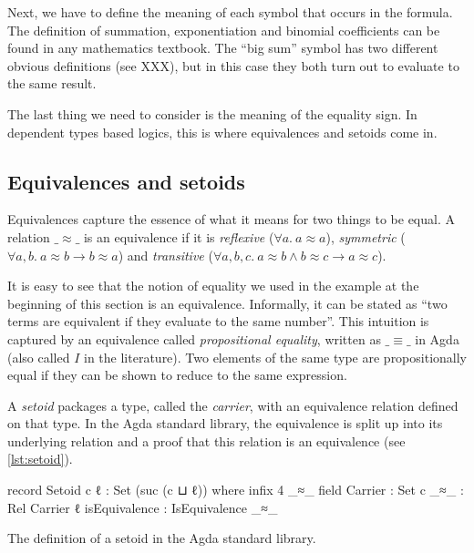 Next, we have to define the meaning of each symbol that occurs in the formula. The definition of summation, exponentiation and binomial coefficients can be found in any mathematics textbook. The \enquote{big sum} symbol has two different obvious definitions (see XXX), but in this case they both turn out to evaluate to the same result.

The last thing we need to consider is the meaning of the equality sign. In dependent types based logics, this is where equivalences and setoids come in.

\subsection{Equivalences and setoids}

Equivalences capture the essence of what it means for two things to be equal. A relation \(\_\!\!\approx\!\!\_\) is an equivalence if it is \emph{reflexive} (\(\forall a.\ a \approx a\)), \emph{symmetric} (\(\forall a,b.\ a \approx b \rightarrow b \approx a\)) and \emph{transitive} (\(\forall a,b,c.\ a \approx b \wedge b \approx c \rightarrow a \approx c\)).

It is easy to see that the notion of equality we used in the example at the beginning of this section is an equivalence. Informally, it can be stated as \enquote{two terms are equivalent if they evaluate to the same number}. This intuition is captured by an equivalence called \emph{propositional equality}, written as \(\_\!\!\equiv\!\!\_\) in Agda (also called \(I\) in the literature). Two elements of the same type are propositionally equal if they can be shown to reduce to the same expression.

A \emph{setoid} packages a type, called the \emph{carrier}, with an equivalence relation defined on that type. In the Agda standard library, the equivalence is split up into its underlying relation and a proof that this relation is an equivalence (see \cref{lst:setoid}).

\begin{listing}[h]
    \begin{agdacode}
record Setoid c ℓ : Set (suc (c ⊔ ℓ)) where
  infix 4 _≈_
  field
    Carrier       : Set c
    _≈_           : Rel Carrier ℓ
    isEquivalence : IsEquivalence _≈_
    \end{agdacode}
    \label{lst:setoid}
    \caption{The definition of a setoid in the Agda standard library.}
\end{listing}


